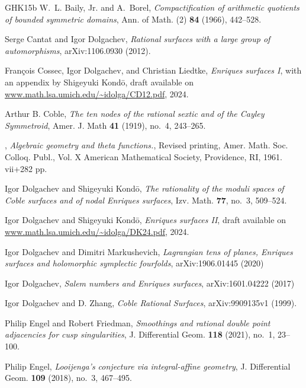 \documentclass{amsart}
\begin{document}
\begin{thebibliography}{GHK15b}
W.~L. Baily, Jr. and A.~Borel, \emph{Compactification of arithmetic quotients
  of bounded symmetric domains}, Ann. of Math. (2) \textbf{84} (1966),
  442--528. 

Serge Cantat and Igor Dolgachev,
\emph{Rational surfaces with a large group of automorphisms},
arXiv:1106.0930 (2012).

Fran\c{c}ois Cossec, Igor Dolgachev, and Christian Liedtke, \emph{Enriques
  surfaces {I}}, with an appendix by Shigeyuki Kond\={o}, draft available on
  \url{www.math.lsa.umich.edu/~idolga/CD12.pdf}, 2024.

Arthur B. Coble,
\emph{The ten nodes of the rational sextic and of the Cayley Symmetroid},
Amer. J. Math \textbf{41} (1919), no.~4, 243--265. 

\bysame,
\emph{Algebraic geometry and theta functions.},
Revised printing,
Amer. Math. Soc. Colloq. Publ., Vol. X
American Mathematical Society, Providence, RI, 1961. vii+282 pp. 

Igor Dolgachev and Shigeyuki Kond\=o,
\emph{The rationality of the moduli spaces of Coble surfaces and of nodal Enriques surfaces},
Izv. Math. \textbf{77}, no.~3, 509--524.

Igor Dolgachev and Shigeyuki Kond\=o, \emph{Enriques surfaces {II}}, draft
available on \url{www.math.lsa.umich.edu/~idolga/DK24.pdf}, 2024.

Igor Dolgachev and Dimitri Markushevich,
\emph{Lagrangian tens of planes, Enriques surfaces and holomorphic symplectic fourfolds},
arXiv:1906.01445 (2020)

Igor Dolgachev,
\emph{Salem numbers and Enriques surfaces},
arXiv:1601.04222 (2017)

Igor Dolgachev and D. Zhang,
\emph{Coble Rational Surfaces},
arXiv:9909135v1 (1999).

Philip Engel and Robert Friedman, \emph{Smoothings and rational double point
  adjacencies for cusp singularities}, J. Differential Geom. \textbf{118}
  (2021), no.~1, 23--100. 

Philip Engel, \emph{Looijenga's conjecture via integral-affine geometry}, J.
  Differential Geom. \textbf{109} (2018), no.~3, 467--495. 


\end{thebibliography}
\end{document}

